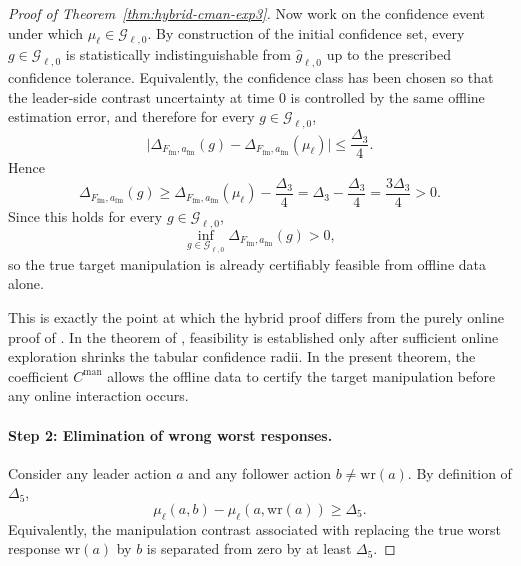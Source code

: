 \documentclass{article}
\begin{document}
\begin{proof}[Proof of Theorem~\ref{thm:hybrid-cman-exp3}]
Now work on the confidence event under which
$\mu_\ell\in\mathcal G_{\ell,0}$. By construction of the initial
confidence set, every $g\in\mathcal G_{\ell,0}$ is statistically
indistinguishable from $\widehat g_{\ell,0}$ up to the prescribed
confidence tolerance. Equivalently, the confidence class has been
chosen so that the leader-side contrast uncertainty at time $0$ is
controlled by the same offline estimation error, and therefore for
every $g\in\mathcal G_{\ell,0}$,
\[
\bigl|
\Delta_{F_{\mathrm{fm}},a_{\mathrm{fm}}}(g)
-
\Delta_{F_{\mathrm{fm}},a_{\mathrm{fm}}}(\mu_\ell)
\bigr|
\le
\frac{\Delta_3}{4}.
\]
Hence
\[
\Delta_{F_{\mathrm{fm}},a_{\mathrm{fm}}}(g)
\ge
\Delta_{F_{\mathrm{fm}},a_{\mathrm{fm}}}(\mu_\ell)-\frac{\Delta_3}{4}
=
\Delta_3-\frac{\Delta_3}{4}
=
\frac{3\Delta_3}{4}
>0.
\]
Since this holds for every $g\in\mathcal G_{\ell,0}$,
\[
\inf_{g\in\mathcal G_{\ell,0}}
\Delta_{F_{\mathrm{fm}},a_{\mathrm{fm}}}(g)>0,
\]
so the true target manipulation is already certifiably feasible from
offline data alone.

This is exactly the point at which the hybrid proof differs from the
purely online proof of \cite{yu2024decentralized}. In the theorem of
\cite{yu2024decentralized}, feasibility is established only after
sufficient online exploration shrinks the tabular confidence radii. In
the present theorem, the coefficient $C^{\mathrm{man}}$ allows the
offline data to certify the target manipulation before any online
interaction occurs.

\paragraph{Step 2: Elimination of wrong worst responses.}
Consider any leader action $a$ and any follower action
$b\neq \mathrm{wr}(a)$. By definition of $\Delta_5$,
\[
\mu_\ell(a,b)-\mu_\ell(a,\mathrm{wr}(a))\ge \Delta_5.
\]
Equivalently, the manipulation contrast associated with replacing the
true worst response $\mathrm{wr}(a)$ by $b$ is separated from zero by
at least $\Delta_5$.


\end{proof}
\end{document}
